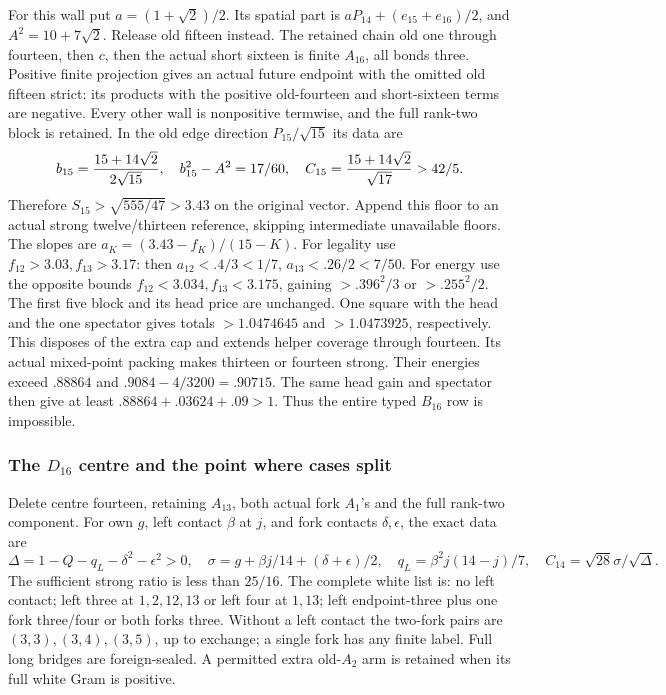 \documentclass[11pt]{article}
\theoremstyle{definition}
\theoremstyle{remark}
\begin{document}
For this wall put \(a=(1+\sqrt2)/2\). Its spatial part is
\(aP_{14}+(e_{15}+e_{16})/2\), and \(A^2=10+7\sqrt2\).
Release old fifteen instead. The retained chain
old one through fourteen, then \(c\), then the actual short sixteen
is finite \(A_{16}\), all bonds three. Positive finite projection
gives an actual future endpoint with the omitted old fifteen strict:
its products with the positive old-fourteen and short-sixteen terms
are negative. Every other wall is nonpositive termwise, and the full
rank-two block is retained. In the old edge direction
\(P_{15}/\sqrt{15}\) its data are
\[
 b_{15}={15+14\sqrt2\over2\sqrt{15}},\quad
 b_{15}^2-A^2=17/60,\quad
 C_{15}={15+14\sqrt2\over\sqrt{17}}>42/5.
\]
Therefore \(S_{15}>\sqrt{555/47}>3.43\) on the original vector.
Append this floor to an actual strong twelve/thirteen reference,
skipping intermediate unavailable floors. The slopes are
\(a_K=(3.43-f_K)/(15-K)\). For legality use
\(f_{12}>3.03,f_{13}>3.17\): then
\(a_{12}<.4/3<1/7\), \(a_{13}<.26/2<7/50\).
For energy use the opposite bounds
\(f_{12}<3.034,f_{13}<3.175\), gaining
\(>.396^2/3\) or \(>.255^2/2\).
The first five block and its head price are unchanged. One square
with the head and the one spectator gives totals
\(>1.0474645\) and \(>1.0473925\), respectively.
This disposes of the extra cap and extends helper coverage through
fourteen. Its actual mixed-point packing makes thirteen or fourteen
strong. Their energies exceed \(.88864\) and
\(.9084-4/3200=.90715\). The same head gain and spectator
then give at least \(.88864+.03624+.09>1\).
Thus the entire typed \(B_{16}\) row is impossible.

\subsubsection{The \(D_{16}\) centre and the point where cases split}
Delete centre fourteen, retaining \(A_{13}\), both actual fork
\(A_1\)'s and the full rank-two component. For own \(g\), left
contact \(\beta\) at \(j\), and fork contacts \(\delta,\epsilon\),
the exact data are
\[
 \Delta=1-Q-q_L-\delta^2-\epsilon^2>0,\quad
 \sigma=g+\beta j/14+(\delta+\epsilon)/2,\quad
 q_L=\beta^2j(14-j)/7,\quad C_{14}=\sqrt{28}\sigma/\sqrt\Delta.
\]
The sufficient strong ratio is less than \(25/16\).
The complete white list is: no left contact; left three at
\(1,2,12,13\) or left four at \(1,13\); left endpoint-three
plus one fork three/four or both forks three. Without a left
contact the two-fork pairs are \((3,3),(3,4),(3,5)\), up to
exchange; a single fork has any finite label. Full long bridges
are foreign-sealed. A permitted extra old-\(A_2\) arm is retained
when its full white Gram is positive.
\end{document}
